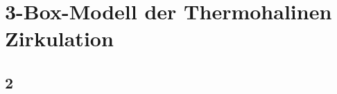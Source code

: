 %
%
%
\chapter{3-Box-Modell der Thermohalinen Zirkulation\label{chapter:thermohalin}}
\begin{refsection}

	
	
	
	
	
	
	\section{2}



\printbibliography[heading=subbibliography]
\end{refsection}

